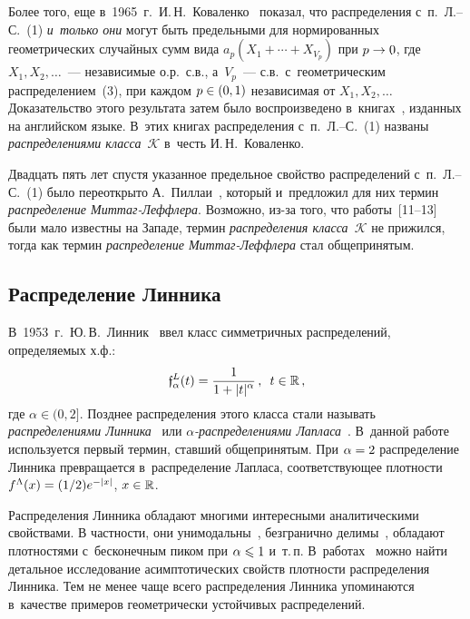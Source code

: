 \begin{multicols}{2}
{}

Более того, еще в~1965~г.\ И.\,Н.~Коваленко~\cite{Kovalenko1965}
показал, что распределения с~п.~Л.--С.~(1) \textit{и~только они} могут
быть предельными для нормированных геометрических случайных сумм
вида $a_p(X_1+\cdots+X_{V_p})$ при $p\hm\to0$, где $X_1,X_2,\ldots$~---
независимые о.р.\ с.в., а~$V_p$~--- с.в.\ с~геометрическим
распределением~(3), при каждом $p\hm\in(0,1)$ независимая от
$X_1,X_2,\ldots$ Доказательство этого результата затем было
воспроизведено в~книгах~\cite{GnedenkoKovalenko1968,
GnedenkoKovalenko1989, GnedenkoKorolev1996}, изданных на
английском языке. В~этих книгах распределения с~п.~Л.--С.~(1)
названы \textit{распределениями класса~$\mathcal{K}$} в~честь И.\,Н.~Коваленко.

Двадцать пять лет спустя указанное предельное свойство распределений
с~п.~Л.--С.~(1) было переоткрыто А.~Пиллаи~\cite{Pillai1989,
Pillai1990}, который и~предложил для них термин \textit{распределение
Мит\-таг-Леф\-фле\-ра}. Возможно, из-за того, что работы~[11--13] были
мало известны на Западе, термин \textit{распределения класса~$\mathcal{K}$} 
не прижился, тогда как термин \textit{распределение
Мит\-таг-Леф\-фле\-ра} стал общепринятым.
{

}

\subsection{Распределение Линника}

В~1953~г.\ Ю.\,В.~Линник~\cite{Linnik1953} ввел класс сим\-мет\-рич\-ных
распределений, определяемых х.ф.:
$$
\mathfrak{f}^L_{\alpha}(t)=\displaystyle\frac{\displaystyle 1\mathstrut}{\displaystyle 1+|t|^{\alpha}\mathstrut}\,,\enskip
t\in\mathbb{R}\,,
$$
где $\alpha\in(0,2]$. Позднее распределения этого класса стали
называть \textit{распределениями Линника}~\cite{Kotz2001} или 
\textit{$\alpha$-рас\-пре\-де\-ле\-ни\-ями Лапласа}~\cite{Pillai1985}. В~данной работе
используется первый термин, ставший общепринятым. При $\alpha\hm=2$
распределение Линника превращается в~распределение Лапласа,
соответствующее плот\-ности
$f^{\Lambda}(x)\hm=(1/2)e^{-|x|}$, $x\hm\in\mathbb{R}$.

Распределения Линника обладают многими интересными аналитическими
свойствами. В частности, они унимодальны~\cite{Laha1961},
безгранично делимы~\cite{Devroye1990}, обладают плотностями 
с~бесконечным пиком при $\alpha\hm\leqslant1$ \cite{Devroye1990} и~т.\,п. 
В~работах~\cite{KotzOstrovskiiHayfavi1995a,
KotzOstrovskiiHayfavi1995b} можно найти детальное исследование
асимптотических свойств плотности распределения Линника. Тем не
менее чаще всего распределения Линника упоминаются в~качестве
примеров геометрически устойчивых распределений.


\end{multicols}
